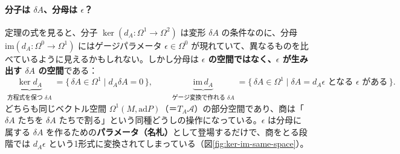\documentclass[uplatex, dvipdfmx, book]{jsbook}
\begin{document}
\paragraph{分子は $\delta A$、分母は $\epsilon$？}
定理の式を見ると、分子 $\ker(d_A:\Omega^1\to\Omega^2)$ は変形 $\delta A$ の条件なのに、分母 $\mathrm{im}(d_A:\Omega^0\to\Omega^1)$ にはゲージパラメータ $\epsilon \in \Omega^0$ が現れていて、異なるものを比べているように見えるかもしれない。しかし分母は \textbf{$\epsilon$ の空間ではなく、$\epsilon$ が生み出す $\delta A$ の空間}である：
\begin{equation*}
    \underbrace{\ker d_A}_{\substack{\text{方程式を保つ } \delta A}}
    = \{\,\delta A \in \Omega^1 \mid d_A\delta A = 0\,\},
    \qquad
    \underbrace{\mathrm{im}\,d_A}_{\substack{\text{ゲージ変換で作れる } \delta A}}
    = \{\,\delta A \in \Omega^1 \mid \delta A = d_A\epsilon \text{ となる } \epsilon \text{ がある}\,\}.
\end{equation*}
どちらも同じベクトル空間 $\Omega^1(M,\mathrm{ad}P)$（＝$T_A\mathcal{A}$）の部分空間であり、商は「$\delta A$ たちを $\delta A$ たちで割る」という同種どうしの操作になっている。$\epsilon$ は分母に属する $\delta A$ を作るための\textbf{パラメータ（名札）}として登場するだけで、商をとる段階では $d_A\epsilon$ という1形式に変換されてしまっている（図\ref{fig:ker-im-same-space}）。
\end{document}
